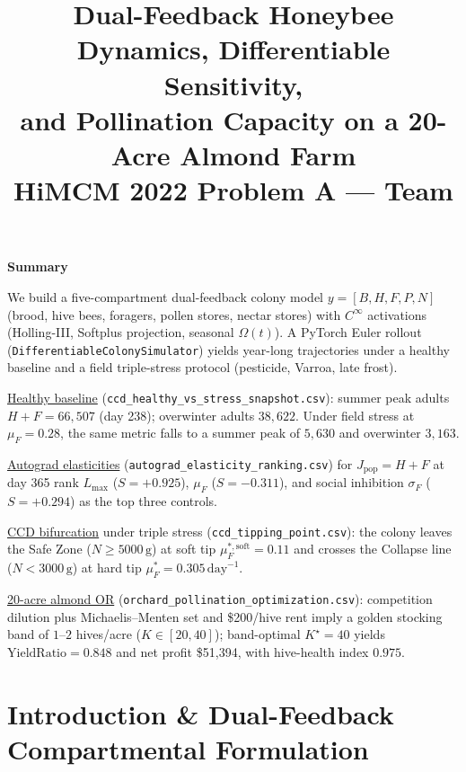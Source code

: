 \documentclass[12pt]{article}
\title{\textbf{Dual-Feedback Honeybee Dynamics, Differentiable Sensitivity,\\
and Pollination Capacity on a 20-Acre Almond Farm}\\[0.4em]
\large HiMCM 2022 Problem A --- Team \TeamNumber}
\author{}
\date{}
\newcommand{\Lmax}{L_{\max}}
\newcommand{\muF}{\mu_{F}}
\newcommand{\sigF}{\sigma_{F}}
\begin{document}
\maketitle
\thispagestyle{empty}

\begin{center}
{\Large \textbf{Summary}}
\end{center}

\noindent
We build a five-compartment dual-feedback colony model
\(y=[B,H,F,P,N]\) (brood, hive bees, foragers, pollen stores, nectar stores)
with \(C^\infty\) activations (Holling-III, Softplus projection, seasonal
\(\Omega(t)\)). A PyTorch Euler rollout
(\texttt{DifferentiableColonySimulator}) yields year-long trajectories under
a healthy baseline and a field triple-stress protocol (pesticide, Varroa,
late frost).

\underline{Healthy baseline} (\texttt{ccd\_healthy\_vs\_stress\_snapshot.csv}):
summer peak adults \(H+F=66{,}507\) (day 238); overwinter adults
\(38{,}622\). Under field stress at \(\muF=0.28\), the same metric falls to
a summer peak of \(5{,}630\) and overwinter \(3{,}163\).

\underline{Autograd elasticities}
(\texttt{autograd\_elasticity\_ranking.csv}) for
\(J_{\mathrm{pop}}=H+F\) at day 365 rank
\(\Lmax\) (\(S=+0.925\)), \(\muF\) (\(S=-0.311\)), and social inhibition
\(\sigF\) (\(S=+0.294\)) as the top three controls.

\underline{CCD bifurcation} under triple stress
(\texttt{ccd\_tipping\_point.csv}): the colony leaves the Safe Zone
(\(N\ge 5000\,\mathrm{g}\)) at soft tip \(\muF^{\ast,\mathrm{soft}}=0.11\)
and crosses the Collapse line (\(N<3000\,\mathrm{g}\)) at hard tip
\(\muF^{\ast}=0.305\,\mathrm{day}^{-1}\).

\underline{20-acre almond OR}
(\texttt{orchard\_pollination\_optimization.csv}): competition dilution
plus Michaelis--Menten set and \$200/hive rent imply a golden stocking band
of \(1\)--\(2\) hives/acre (\(K\in[20,40]\)); band-optimal
\(K^\star=40\) yields \(\mathrm{YieldRatio}=0.848\) and net profit
\$51{,}394, with hive-health index \(0.975\).

\tableofcontents
\newpage

\section{Introduction \& Dual-Feedback Compartmental Formulation}
\end{document}
